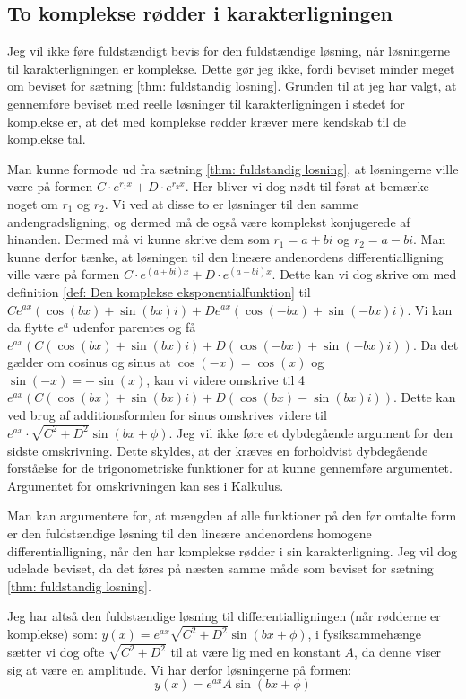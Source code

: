 \subsection{To komplekse rødder i karakterligningen}
\label{teori: Komplekse losninger i karakterligningen}
Jeg vil ikke føre fuldstændigt bevis for den fuldstændige løsning, når løsningerne til karakterligningen er komplekse. 
Dette gør jeg ikke, fordi beviset minder meget om beviset for sætning \ref{thm: fuldstandig losning}.
Grunden til at jeg har valgt, at gennemføre beviset med reelle løsninger til karakterligningen i stedet for komplekse er, at det med komplekse rødder kræver mere kendskab til de komplekse tal.

Man kunne formode ud fra sætning \ref{thm: fuldstandig losning}, at løsningerne ville være på formen $C\cdot e^{r_1 x} + D \cdot e^{r_2 x}$.
Her bliver vi dog nødt til først at bemærke noget om $r_1$ og $r_2$.
Vi ved at disse to er løsninger til den samme andengradsligning, og dermed må de også være komplekst konjugerede af hinanden. 
Dermed må vi kunne skrive dem som $r_1 = a + bi$ og $r_2 = a-bi$. 
Man kunne derfor tænke, at løsningen til den lineære andenordens differentialligning ville være på formen $C\cdot e^{(a+bi) x} + D \cdot e^{(a-bi)x}$.
Dette kan vi dog skrive om med definition \ref{def: Den komplekse eksponentialfunktion} til $Ce^{ax}(\cos(bx) + \sin(bx) i) + De^{ax}(\cos(-bx) + \sin(-bx) i)$.
Vi kan da flytte $e^{a}$ udenfor parentes og få 
$e^{ax}(C(\cos(bx) + \sin(bx) i) + D(\cos(-bx) + \sin(-bx) i))$.
Da det gælder om cosinus og sinus at $\cos(-x)=\cos(x)$ og $\sin(-x)=-\sin(x)$, kan vi videre omskrive til 4
$e^{ax}(C(\cos(bx) + \sin(bx) i) + D(\cos(bx) - \sin(bx) i))$. 
Dette kan ved brug af additionsformlen for sinus omskrives videre til $e^{ax}\cdot \sqrt{C^2 + D^2}\sin(bx+\phi)$. 
Jeg vil ikke føre et dybdegående argument for den sidste omskrivning.
Dette skyldes, at der kræves en forholdvist dybdegående forståelse for de trigonometriske funktioner for at kunne gennemføre argumentet. 
Argumentet for omskrivningen kan ses i Kalkulus.

Man kan argumentere for, at mængden af alle funktioner på den før omtalte form er den fuldstændige løsning til den lineære andenordens homogene differentialligning, når den har komplekse rødder i sin karakterligning. 
Jeg vil dog udelade beviset, da det føres på næsten samme måde som beviset for sætning \ref{thm: fuldstandig losning}. 

Jeg har altså den fuldstændige løsning til differentialligningen (når rødderne er komplekse) som:
$y(x) = e^{ax}\sqrt{C^2 + D^2}\sin(bx+\phi)$, i fysiksammehænge sætter vi dog ofte $\sqrt{C^2 + D^2}$ til at være lig med en konstant $A$, da denne viser sig at være en amplitude. 
Vi har derfor løsningerne på formen:
$$y(x) = e^{ax}A\sin(bx+\phi)$$


